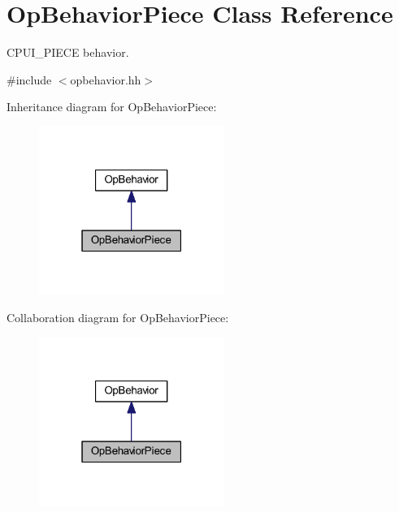 \hypertarget{class_op_behavior_piece}{}\section{Op\+Behavior\+Piece Class Reference}
\label{class_op_behavior_piece}


C\+P\+U\+I\+\_\+\+P\+I\+E\+CE behavior.  




{\ttfamily \#include $<$opbehavior.\+hh$>$}



Inheritance diagram for Op\+Behavior\+Piece\+:
\nopagebreak
\begin{figure}[H]
\begin{center}
\leavevmode
\includegraphics[width=171pt]{class_op_behavior_piece__inherit__graph}
\end{center}
\end{figure}


Collaboration diagram for Op\+Behavior\+Piece\+:
\nopagebreak
\begin{figure}[H]
\begin{center}
\leavevmode
\includegraphics[width=171pt]{class_op_behavior_piece__coll__graph}
\end{center}
\end{figure}
